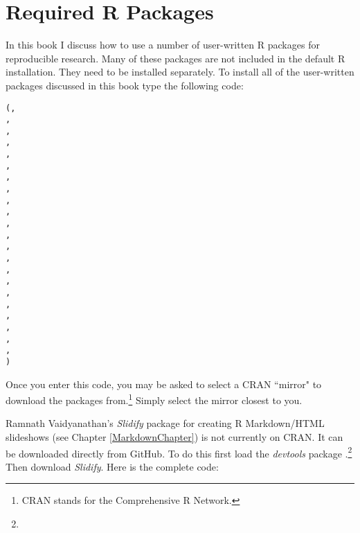 


\chapter*{Required R Packages} \label{ReqPackages}

In this book I discuss how to use a number of user-written R packages for reproducible research. Many of these packages are not included in the default R installation. They need to be installed separately. To install all of the user-written packages discussed in this book type the following code:

\begin{knitrout}
\color{fgcolor}\begin{kframe}
\begin{alltt}
(,
                , 
                , 
                ,
                , 
                ,
                ,
                , 
                , 
                , 
                ,
                , 
                ,
                ,
                ,
                ,
                ,
                ,
                ,
                ,    
                ,                 
                , 
                )
\end{alltt}
\end{kframe}
\end{knitrout}


\noindent Once you enter this code, you may be asked to select a CRAN ``mirror" to download the packages from.\footnote{CRAN stands for the Comprehensive R Network.} Simply select the mirror closest to you.

 Ramnath Vaidyanathan's \emph{Slidify} package \citeyearpar{R-slidify} for creating R Markdown/HTML slideshows (see Chapter \ref{MarkdownChapter}) is not currently on CRAN. It can be downloaded directly from GitHub. To do this first load the \emph{devtools} package \cite[]{R-devtools}.\footnote{} Then download \emph{Slidify}. Here is the complete code:

